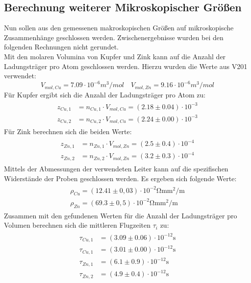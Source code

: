 \subsection{Berechnung weiterer Mikroskopischer Größen}
Nun sollen aus den gemessenen makroskopischen Größen auf mikroskopische Zusammenhänge geschlossen werden. Zwischenergebnisse
wurden bei den folgenden Rechnungen nicht gerundet. \\
Mit den molaren Volumina von Kupfer und Zink kann auf die Anzahl der Ladungsträger pro Atom
geschlossen werden. Hierzu wurden die Werte aus V201 verwendet:
\begin{equation}
  V_{mol, Cu} = 7.09 \cdot 10^{-6} \si{m^3 /mol} \quad   V_{mol, Zn} = 9.16 \cdot 10^{-6} \si{m^3 /mol}
\end{equation}
Für Kupfer ergibt sich die Anzahl der Ladungsträger pro Atom zu:
\begin{align}
  \begin{aligned}
    z_{Cu,1} &= n_{Cu,1} \cdot V_{mol, Cu} =  (2.18 \pm 0.04) \cdot 10^{-3}  \\
    z_{Cu,2} &= n_{Cu,2} \cdot V_{mol, Cu} =  (2.24 \pm 0.00) \cdot 10^{-3}
  \end{aligned}
\end{align}
Für Zink berechnen sich die beiden Werte:
\begin{align}
  \begin{aligned}
    z_{Zn,1} &= n_{Zn,1} \cdot V_{mol, Zn} =  (2.5\pm 0.4)\cdot 10^{-4}\\
    z_{Zn,2} &= n_{Zn,2} \cdot V_{mol, Zn} =   (3.2\pm 0.3)\cdot 10^{-4}
  \end{aligned}
\end{align}
Mittels der Abmessungen der verwendeten Leiter kann auf die spezifischen Widerstände der Proben geschlossen werden. Es ergeben sich folgende Werte:
\begin{align}
  \begin{aligned}
    \rho_{Cu} =  (12.41 \pm 0,03)\cdot 10^{-2} \si{\ohm \milli \meter^2 \per \meter} \\
    \rho_{Zn} =  (69.3 \pm 0,5) \cdot 10^{-2} \si{\ohm \milli \meter^2 \per \meter}
  \end{aligned}
\end{align}
Zusammen mit den gefundenen Werten für die Anzahl der Ladungsträger pro Volumen berechnen sich die mittleren Flugzeiten $\tau_i$ zu:
\begin{align}
  \begin{aligned}
    \tau_{Cu,1} &= (3.09 \pm 0.06) \cdot 10^{-12} \si{\second} \\
    \tau_{Cu,1} &= (3.01 \pm 0.00) \cdot 10^{-12} \si{\second} \\
    \tau_{Zn,1} &= (6.1 \pm 0.9) \cdot 10^{-12} \si{\second} \\
    \tau_{Zn,2} &= (4.9 \pm 0.4) \cdot 10^{-12} \si{\second}
  \end{aligned}
\end{align}
